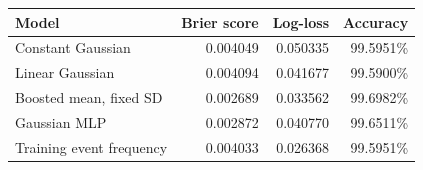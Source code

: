 \begin{center}\small
\begin{tabular}{lrrr}
\toprule
Model & Brier score & Log-loss & Accuracy \\
\midrule
Constant Gaussian & 0.004049 & 0.050335 & 99.5951\% \\
Linear Gaussian & 0.004094 & 0.041677 & 99.5900\% \\
Boosted mean, fixed SD & 0.002689 & 0.033562 & 99.6982\% \\
Gaussian MLP & 0.002872 & 0.040770 & 99.6511\% \\
Training event frequency & 0.004033 & 0.026368 & 99.5951\% \\
\bottomrule
\end{tabular}\end{center}
